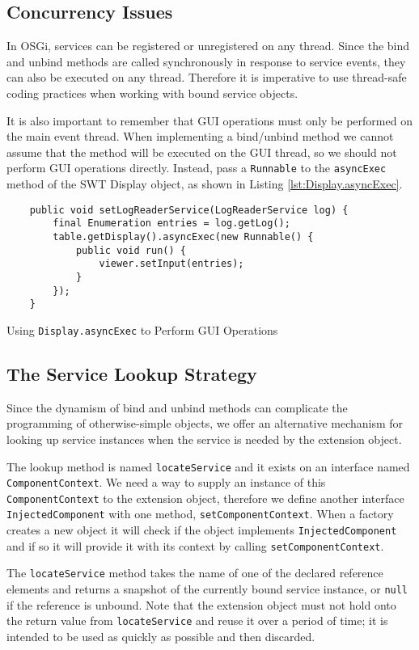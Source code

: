 \documentclass[12pt]{article}
\begin{document}
\subsection{Concurrency Issues}

In OSGi, services can be registered or unregistered on any thread. Since the bind and unbind methods are called synchronously in response to service events, they can also be executed on any thread. Therefore it is imperative to use thread-safe coding practices when working with bound service objects.

It is also important to remember that GUI operations must only be performed on the main event thread. When implementing a bind/unbind method we cannot assume that the method will be executed on the GUI thread, so we should not perform GUI operations directly. Instead, pass a \texttt{Runnable} to the \texttt{asyncExec} method of the SWT Display object, as shown in Listing \ref{lst:Display.asyncExec}.

\begin{program}
	\begin{lstlisting}
	public void setLogReaderService(LogReaderService log) {
		final Enumeration entries = log.getLog();
		table.getDisplay().asyncExec(new Runnable() {
			public void run() {
				viewer.setInput(entries);
			}
		});
	}
	\end{lstlisting}
	\caption{Using \texttt{Display.asyncExec} to Perform GUI Operations}
	\label{lst:Display.asyncExec}
\end{program}

\subsection{The Service Lookup Strategy}

Since the dynamism of bind and unbind methods can complicate the programming of otherwise-simple objects, we offer an alternative mechanism for looking up service instances when the service is needed by the extension object.

The lookup method is named \texttt{locateService} and it exists on an interface named \texttt{ComponentContext}. We need a way to supply an instance of this \texttt{Comp\-onent\-Con\-text} to the extension object, therefore we define another interface \texttt{Inj\-ected\-Comp\-onent} with one method, \texttt{setComponentContext}. When a factory creates a new object it will check if the object implements \texttt{InjectedComponent} and if so it will provide it with its context by calling \texttt{setComponentContext}.

The \texttt{locateService} method takes the name of one of the declared reference elements and returns a snapshot of the currently bound service instance, or \texttt{null} if the reference is unbound. Note that the extension object must not hold onto the return value from \texttt{locateService} and reuse it over a period of time; it is intended to be used as quickly as possible and then discarded.
\end{document}
